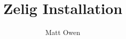 
\usepackage{url}
\usepackage{hyperref}

\title{Zelig Installation}
\author{Matt Owen}



\maketitle




